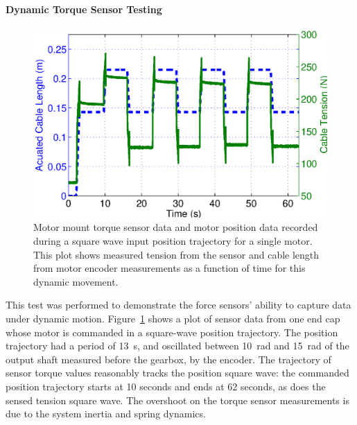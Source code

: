 \paragraph{Dynamic Torque Sensor Testing}
\begin{figure}[thpb]
      \centering
      \includegraphics[width=0.8\columnwidth]{tex/img/ICRA2015_dynamic_sensor_test}
      \caption{Motor mount torque sensor data and motor position data recorded during a square wave input position trajectory for a single motor. This plot shows measured tension from the sensor and cable length from motor encoder measurements as a function of time for this dynamic movement.}
      \label{fig:sensor1data}
\end{figure}

This test was performed to demonstrate the force sensors' ability to capture data under dynamic motion.
Figure~\ref{fig:sensor1data} shows a plot of sensor data from one end cap whose motor is commanded in a square-wave position trajectory.
The position trajectory had a period of \SI{13}{\second}, and oscillated between \SI{10}{\radian} and \SI{15}{\radian} of the output shaft measured before the gearbox, by the encoder.
The trajectory of sensor torque values reasonably tracks the position square wave: the commanded position trajectory starts at 10 seconds and ends at 62 seconds, as does the sensed tension square wave.
The overshoot on the torque sensor measurements is due to the system inertia and spring dynamics.


